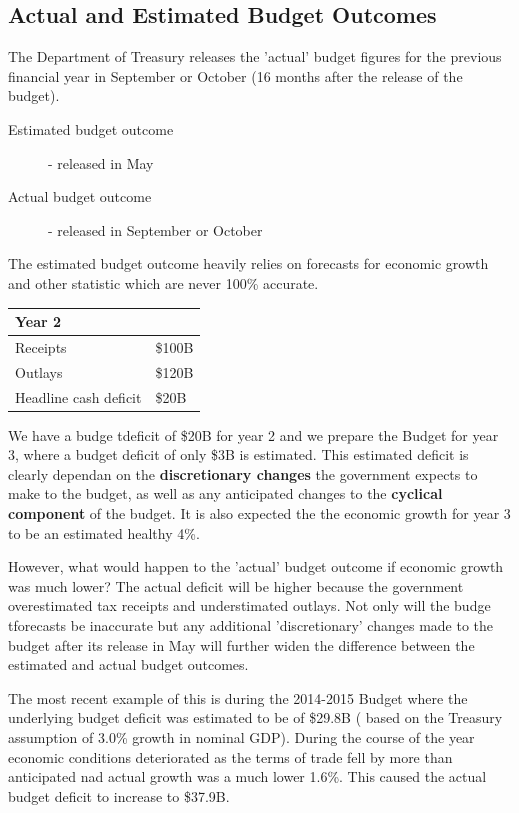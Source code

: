 \documentclass[11pt]{article}
\begin{document}
\subsection{Actual and Estimated Budget Outcomes}
\label{sec-1-7}

The Department of Treasury releases the 'actual' budget figures for
the previous financial year in September or October (16 months after
the release of the budget).

\begin{description}
\item[{Estimated budget outcome}] - released in May
\item[{Actual budget outcome}] - released in September or October
\end{description}

The estimated budget outcome heavily relies on forecasts for economic
growth and other statistic which are never 100\% accurate.

\begin{center}
\begin{tabular}{ll}
Year 2 & \\
\hline
Receipts & \$100B\\
Outlays & \$120B\\
Headline cash deficit & \$20B\\
\end{tabular}
\end{center}

We have a budge tdeficit of \$20B for year 2 and we prepare the Budget
for year 3, where a budget deficit of only \$3B is estimated. This
estimated deficit is clearly dependan on the \textbf{discretionary changes}
the government expects to make to the budget, as well as any
anticipated changes to the \textbf{cyclical component} of the budget. It is
also expected the the economic growth for year 3 to be an estimated
healthy 4\%.

However, what would happen to the 'actual' budget outcome if economic
growth was much lower? The actual deficit will be higher because the
government overestimated tax receipts and understimated outlays. Not
only will the budge tforecasts be inaccurate but any additional
'discretionary' changes made to the budget after its release in May
will further widen the difference between the estimated and actual
budget outcomes.

The most recent example of this is during the 2014-2015 Budget where
the underlying budget deficit was estimated to be of \$29.8B ( based on
the Treasury assumption of 3.0\% growth in nominal GDP). During the
course of the year economic conditions deteriorated as the terms of
trade fell by more than anticipated nad actual growth was a much lower
1.6\%. This caused the actual budget deficit to increase to \$37.9B.
\end{document}
